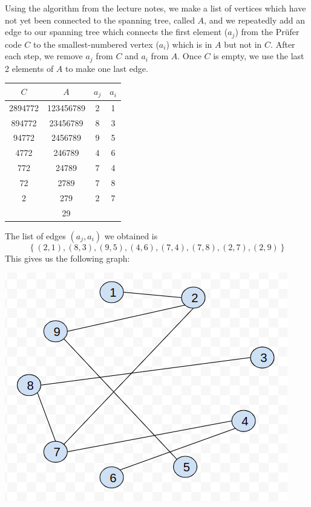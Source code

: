 \documentclass[12pt]{article}
\begin{document}
\section{}
\noindent{}\bigskip\par
Using the algorithm from the lecture notes, we make a list of vertices which have not yet been connected to the spanning tree, called $A$, and we repeatedly add an edge to our spanning tree which connects the first element ($a_j$) from the Prüfer code $C$ to the smallest-numbered vertex ($a_i$) which is in $A$ but not in $C$. After each step, we remove $a_j$ from $C$ and $a_i$ from $A$. Once $C$ is empty, we use the last 2 elements of $A$ to make one last edge.
\begin{center}
    \begin{tabular}{|c|c|c|c|}
        \hline
        $C$ & $A$ & $a_j$ & $a_i$ \\
        \hline
        2894772 & 123456789 & 2 & 1 \\
        894772 & 23456789 & 8 & 3 \\
        94772 & 2456789 & 9 & 5 \\
        4772 & 246789 & 4 & 6 \\
        772 & 24789 & 7 & 4 \\
        72 & 2789 & 7 & 8 \\
        2 & 279 & 2 & 7 \\
        & 29 & & \\
        \hline
    \end{tabular}
\end{center}
The list of edges $(a_j, a_i)$ we obtained is
\[ \left\{ (2,1),(8,3),(9,5),(4,6),(7,4),(7,8),(2,7),(2,9) \right\} \]
This gives us the following graph:
\begin{center}
    \includegraphics[width=\textwidth]{kruskal_tree.png}
\end{center}
\end{document}
